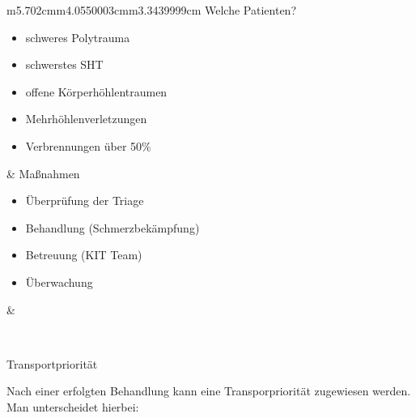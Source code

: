 \documentclass{article}
\begin{document}
\begin{center}
\tablehead{}\begin{supertabular}{m{5.702cm}m{4.0550003cm}m{3.3439999cm}}
Welche Patienten?

\begin{itemize}
\item schweres Polytrauma

\item schwerstes SHT

\item offene K\"orperh\"ohlentraumen

\item Mehrh\"ohlenverletzungen

\item Verbrennungen \"uber 50\%

\end{itemize}
 &
Ma{\ss}nahmen

\begin{itemize}
\item \"Uberpr\"ufung der Triage

\item Behandlung  (Schmerzbek\"ampfung)

\item Betreuung (KIT Team)

\item \"Uberwachung

\end{itemize}
 &
 \par

\\
\end{supertabular}
\end{center}
Transportpriorit\"at

Nach einer erfolgten Behandlung kann eine Transporpriorit\"at zugewiesen
werden. Man unterscheidet hierbei: 
\end{document}
